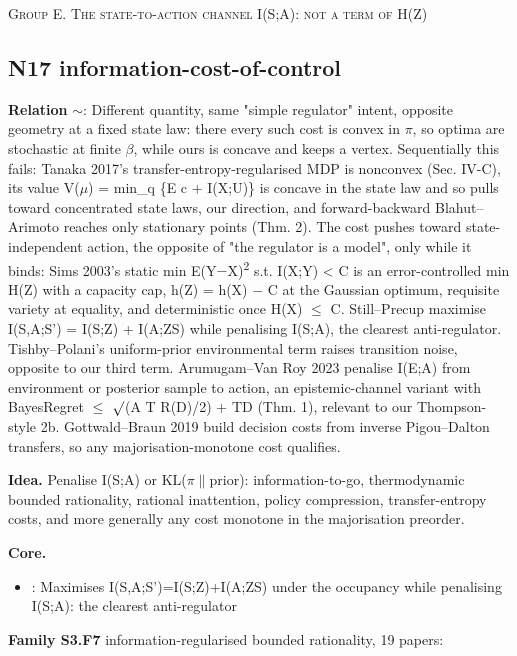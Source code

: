 \documentclass[10pt]{article}
\newcommand{\memb}[1]{\par\smallskip\textbf{#1}\quad}
\begin{document}
\medskip\textsc{Group E. The state-to-action channel I(S;A): not a term of H(Z)}

\subsection{N17 information-cost-of-control}\label{node:S3-N17-information-cost-of-control}
\textbf{Relation} $\sim$: Different quantity, same "simple regulator" intent, opposite geometry at a fixed state law: there every such cost is convex in \ensuremath{\pi}, so optima are stochastic at finite \ensuremath{\beta}, while ours is concave and keeps a vertex. Sequentially this fails: Tanaka 2017's transfer-entropy-regularised MDP is nonconvex (Sec. IV-C), its value V(\ensuremath{\mu}) = min\_q \{E c + I(X;U)\} is concave in the state law and so pulls toward concentrated state laws, our direction, and forward-backward Blahut--Arimoto reaches only stationary points (Thm. 2). The cost pushes toward state-independent action, the opposite of "the regulator is a model", only while it binds: Sims 2003's static min E(Y\ensuremath{-}X)\textsuperscript{2} s.t. I(X;Y) \textless{} C is an error-controlled min H(Z) with a capacity cap, h(Z) = h(X) \ensuremath{-} C at the Gaussian optimum, requisite variety at equality, and deterministic once H(X) \ensuremath{\leq} C. Still--Precup maximise I(S,A;S') = I(S;Z) + I(A;Z\textbar{}S) while penalising I(S;A), the clearest anti-regulator. Tishby--Polani's uniform-prior environmental term raises transition noise, opposite to our third term. Arumugam--Van Roy 2023 penalise I(E;A) from environment or posterior sample to action, an epistemic-channel variant with BayesRegret \ensuremath{\leq} \ensuremath{\surd}(\textbar{}A\textbar{} T R(D)/2) + TD (Thm. 1), relevant to our Thompson-style 2b. Gottwald--Braun 2019 build decision costs from inverse Pigou--Dalton transfers, so any majorisation-monotone cost qualifies.

\textbf{Idea.} Penalise I(S;A) or KL(\ensuremath{\pi}\ensuremath{\|}prior): information-to-go, thermodynamic bounded rationality, rational inattention, policy compression, transfer-entropy costs, and more generally any cost monotone in the majorisation preorder.

\memb{Core.}
\begin{itemize}[nosep,leftmargin=1.2em]
\item \citet{Still-information12}: Maximises I(S,A;S')=I(S;Z)+I(A;Z\textbar{}S) under the occupancy while penalising I(S;A): the clearest anti-regulator
\end{itemize}
\memb{Family S3.F7} information-regularised bounded rationality, 19 papers: {\footnotesize \citetext{\citealp{Still-information12}; \citealp{Sims-implications03}; \citealp{Rubin-trading12}; \citealp{Fox-taming15}; \citealp{Genewein-bounded15}; \citealp{Ortega-information15}; \citealp{Grau-Moya-planning16}; \citealp{Leibfried-information17}; \citealp{Tanaka-transfer17}; \citealp{Tiomkin-unified17}; \citealp{Galashov-information19}; \citealp{Gottwald-bounded19}; \citealp{Leibfried-mutual19}; \citealp{Lai-policy21}; \citealp{Arumugam-bayesian23}; \citealp{Grau-Moya-non17}; \citealp{Tirumala-behavior20}; \citealp{Arumugam-rate22b}; \citealp{Lai-human24}}}
\end{document}

